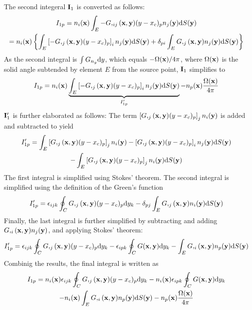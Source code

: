The second integeral ${\bf I}_1$ is converted as follows:
%
\begin{multline}
	I_{1p}
	= n_i({\bf x}) \int_E -G,_{ij}({\bf x}, {\bf y}) 
	(y - x_c)_p
	n_j({\bf y})
	\mathrm{d} S({\bf y}) \\
	= n_i({\bf x})
	\left\{ \int_E \left[-G,_{j}({\bf x}, {\bf y}) 
	(y - x_c)_p\right]_i
	n_j({\bf y})
	\mathrm{d} S({\bf y})
	+
	\delta_{pi}
	\int_E G,_{j}({\bf x}, {\bf y}) 
	n_j({\bf y})
	\mathrm{d} S({\bf y})
	\right\}
\end{multline}
%
As the second integral is $\int G_{n_y} \mathrm{d} y$, which equals $-\Omega({\bf x})/4\pi$, where $\Omega({\bf x})$ is the solid angle subtended by element $E$ from the source point, ${\bf I}_1$ simplifies to
%
\begin{equation}
	I_{1p}
	= 
	n_i({\bf x})
	\underbrace{\int_E
	\left[-G,_{j}({\bf x}, {\bf y}) 
	(y - x_c)_p\right]_i
	n_j({\bf y})
	\mathrm{d} S({\bf y})}_{I'_{1p}}
	-
	n_p({\bf x})
	\frac{\Omega({\bf x})}{4\pi}
\end{equation}
%
${\bf I}'_1$ is further elaborated as follows: The term $\left[G,_{j}({\bf x}, {\bf y}) (y - x_c)_p\right]_j n_i({\bf y})$ is added and subtracted to yield
%
\begin{multline}
	I'_{1p} = 
	\int_E
		\left[G,_{j}({\bf x}, {\bf y}) (y - x_c)_p\right]_j
		n_i({\bf y})
		-
		\left[G,_{j}({\bf x}, {\bf y}) (y - x_c)_p\right]_i
		n_j({\bf y})
	\mathrm{d} S({\bf y}) \\
	-
	\int_E
	\left[G,_{j}({\bf x}, {\bf y}) (y - x_c)_p\right]_j
	n_i({\bf y})
	\mathrm{d} S({\bf y})
\end{multline}
%
The first integral is simplified using Stokes' theorem. The second integral is simplified using the definition of the Green's function
%
\begin{equation}
	I'_{1p} = 
	\epsilon_{ijk}
	\oint_C
	G,_{j}({\bf x}, {\bf y}) (y - x_c)_p
	\mathrm{d} y_k
	-
	\delta_{pj}
	\int_E
		G,_{j}({\bf x}, {\bf y})
		n_i({\bf y})
	\mathrm{d} S({\bf y})
\end{equation}
%
Finally, the last integral is further simplified by subtracting and adding $G,_{i}({\bf x}, {\bf y}) n_j({\bf y})$, and applying Stokes' theorem:
%
\begin{equation}
	I'_{1p} = 
	\epsilon_{ijk}
	\oint_C
	G,_{j}({\bf x}, {\bf y}) (y - x_c)_p
	\mathrm{d} y_k
	-
	\epsilon_{ipk}
	\oint_C
		G({\bf x}, {\bf y})
	\mathrm{d} y_k
	-
	\int_E
		G,_{i}({\bf x}, {\bf y}) n_p({\bf y})
	\mathrm{d} S({\bf y})
\end{equation}
%
Combinig the results, the final integral is written as
%
\begin{multline}
	I_{1p} = 
	n_i({\bf x})
	\epsilon_{ijk}
	\oint_C
	G,_{j}({\bf x}, {\bf y}) (y - x_c)_p
	\mathrm{d} y_k
	-
	n_i({\bf x})
	\epsilon_{ipk}
	\oint_C
		G({\bf x}, {\bf y})
	\mathrm{d} y_k \\
	-
	n_i({\bf x})
	\int_E
		G,_{i}({\bf x}, {\bf y}) n_p({\bf y})
	\mathrm{d} S({\bf y})
	-
	n_p({\bf x}) \frac{\Omega({\bf x})}{4\pi}
\end{multline}
